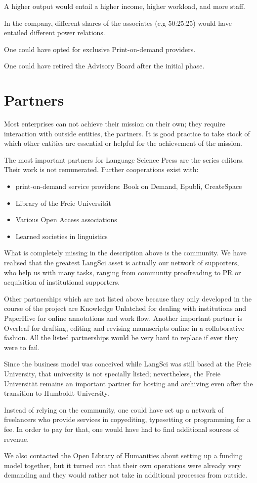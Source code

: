 \documentclass[nonflat,smallfont
]{langsci/langscibook}
\newcommand{\background}[1]{ 
  \vspace{5mm}
  \renewcommand{\tblslinecolour}{lsDarkBlue}
  \tblssy[red]{explore2}{Background}{\vspace*{-5mm}#1}
}
\newcommand{\langscisolution}[1]{
  \renewcommand{\tblslinecolour}{lsLightBlue}
  \tblssy{langsci}{LangSci solution}{\vspace*{-5mm}#1}
}
\newcommand{\evaluation}[1]{
  \renewcommand{\tblslinecolour}{lsLightOrange}
  \tblssy{receipt}{Evaluation}{\vspace*{-5mm}#1}
}
\newcommand{\othersolutions}[1]{
  \renewcommand{\tblslinecolour}{lsDarkGreenOne}
  \tblssy{more}{Other solutions}{\vspace*{-5mm}#1}
}
\renewcommand{\tblssy}[4][black!12]{%
  \renewcommand{\langscisymbol}{#2}\renewcommand{\tblsboxcolor}{#1}
  \begin{mdframed}[style=yellowexercise,frametitle={#3}]
    #4
  \end{mdframed}
}
\begin{document}
\othersolutions{A higher output would entail a higher income, higher workload, and more staff. 

In the company, different shares of the associates (e.g 50:25:25) would have entailed different power relations.

One could have opted for exclusive Print-on-demand providers. 

One could have retired the Advisory Board after the initial phase. 

}
 
\section{Partners}

\background{Most enterprises can not achieve their mission on their own; they require interaction with outside entities, the partners. It is good practice to take stock of which other entities are essential or helpful for the achievement of the mission.}
\langscisolution{
The most important partners for Language Science Press are the series editors. Their work is not remunerated. Further cooperations exist with:
\begin{itemize}
 \item print-on-demand service providers: Book on Demand, Epubli, CreateSpace 
 \item Library of the Freie Universität 
 \item Various Open Access associations 
 \item Learned societies in linguistics
\end{itemize}
}
\evaluation{
What is completely missing in the description above is the community. We have realised that the greatest LangSci asset is actually our network of supporters, who help us with many tasks, ranging from community proofreading to PR or acquisition of institutional supporters. 

Other partnerships which are not listed above because they only developed in the course of the project are Knowledge Unlatched for dealing with institutions and PaperHive for online annotations and work flow. Another important partner is Overleaf for drafting, editing and revising manuscripts online in a collaborative fashion. All the listed partnerships would be very hard to replace if ever they were to fail.

Since the business model was conceived while LangSci was still based at the Freie University, that university is not specially listed; nevertheless, the Freie Universität remains an important partner for hosting and archiving even after the transition to Humboldt University.
}
\othersolutions{ 
Instead of relying on the community, one could have set up a network of freelancers who provide services in copyediting, typesetting or programming for a fee. In order to pay for that, one would have had to find additional sources of revenue. 

We also contacted the Open Library of Humanities about setting up a funding model together, but it turned out that their own operations were already very demanding and they would rather not take in additional processes from outside. 
}
 
\end{document}
